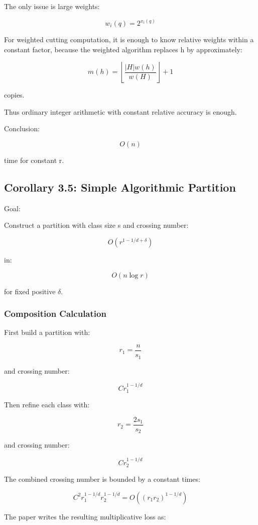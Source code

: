 \documentclass[
  11pt,
]{article}
\begin{document}
The only issue is large weights:

\[
w_i(q)=2^{x_i(q)}
\]

For weighted cutting computation, it is enough to know relative weights
within a constant factor, because the weighted algorithm replaces h by
approximately:

\[
m(h)=\left\lfloor\frac{|H|w(h)}{w(H)}\right\rfloor+1
\]

copies.

Thus ordinary integer arithmetic with constant relative accuracy is
enough.

Conclusion:

\[
O(n)
\]

time for constant r.

\hypertarget{corollary-3.5-simple-algorithmic-partition}{%
\subsection{Corollary 3.5: Simple Algorithmic
Partition}\label{corollary-3.5-simple-algorithmic-partition}}

Goal:

Construct a partition with class size s and crossing number:

\[
O(r^{1-1/d+\delta})
\]

in:

\[
O(n\log r)
\]

for fixed positive \(\delta\).

\hypertarget{composition-calculation}{%
\subsubsection{Composition Calculation}\label{composition-calculation}}

First build a partition with:

\[
r_1=\frac{n}{s_1}
\]

and crossing number:

\[
C r_1^{1-1/d}
\]

Then refine each class with:

\[
r_2=\frac{2s_1}{s_2}
\]

and crossing number:

\[
C r_2^{1-1/d}
\]

The combined crossing number is bounded by a constant times:

\[
C^2 r_1^{1-1/d}r_2^{1-1/d} = O((r_1r_2)^{1-1/d})
\]

The paper writes the resulting multiplicative loss as:
\end{document}
